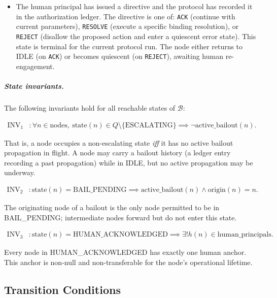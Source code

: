 \begin{itemize}
\item[\textbf{RESOLVED.}] The human principal has issued a directive and the protocol has recorded it in the authorization ledger. The directive is one of: \texttt{ACK} (continue with current parameters), \texttt{RESOLVE} (execute a specific binding resolution), or \texttt{REJECT} (disallow the proposed action and enter a quiescent error state). This state is terminal for the current protocol run. The node either returns to IDLE (on \texttt{ACK}) or becomes quiescent (on \texttt{REJECT}), awaiting human re-engagement.
\end{itemize}

\subparagraph{State invariants.} The following invariants hold for all reachable states of $\mathcal{B}$:

\begin{align}
\text{INV}_1 &: \forall n \in \text{nodes},\ \text{state}(n) \in Q \setminus \{\text{ESCALATING}\} \implies \neg\text{active\_bailout}(n). \tag{INV-1}
\end{align}

That is, a node occupies a non-escalating state \emph{iff} it has no active bailout propagation in flight. A node may carry a bailout history (a ledger entry recording a past propagation) while in IDLE, but no active propagation may be underway.

\begin{align}
\text{INV}_2 &: \text{state}(n) = \text{BAIL\_PENDING} \implies \text{active\_bailout}(n) \land \text{origin}(n) = n. \tag{INV-2}
\end{align}

The originating node of a bailout is the only node permitted to be in BAIL\_PENDING; intermediate nodes forward but do not enter this state.

\begin{align}
\text{INV}_3 &: \text{state}(n) = \text{HUMAN\_ACKNOWLEDGED} \implies \exists! h(n) \in \text{human\_principals}. \tag{INV-3}
\end{align}

Every node in HUMAN\_ACKNOWLEDGED has exactly one human anchor. This anchor is non-null and non-transferable for the node's operational lifetime.

\subsection{Transition Conditions}\label{sec:transition-conditions}

